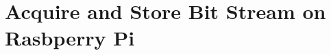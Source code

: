 \section{Acquire and Store Bit Stream on Rasbperry Pi}
\label{sec:app:raspi:aquire}
\inputminted{cpp}{code/main.cpp}



